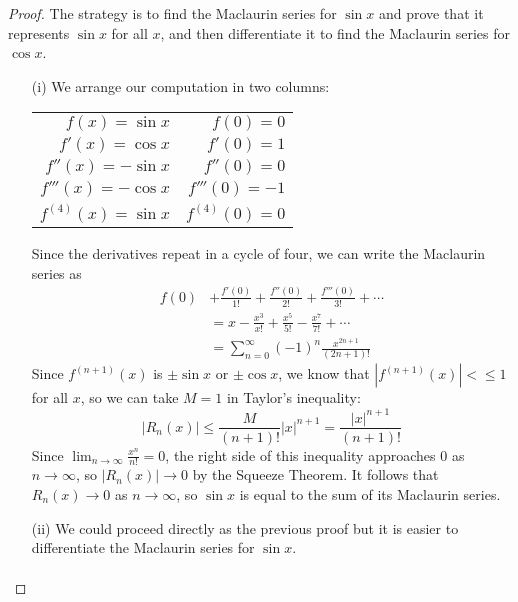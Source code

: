   \begin{proof}\let\qed\relax
    The strategy is to find the Maclaurin series for $\sin x$ and prove that it represents $\sin x$ for all $x$, and then differentiate it to find the Maclaurin series for $\cos x$.
    \begin{enumerate}
      \item[(i)] We arrange our computation in two columns: \\
      \begin{minipage}{\textwidth}
        \begin{center}
          \bgroup
          \def\arraystretch{1.5}
          \begin{tabular}{ r r }
            $f(x) = \sin x$  & $f(0)= 0$ \\
            $f'(x) = \cos x$  & $f'(0)= 1$ \\
            $f''(x) = -\sin x$  & $f''(0)= 0$ \\
            $f'''(x) = -\cos x$  & $f'''(0)= -1$ \\
            $f^{(4)}(x) = \sin x$  & $f^{(4)}(0)= 0$ \\
          \end{tabular}
          \egroup
        \end{center}
      \end{minipage}
      Since the derivatives repeat in a cycle of four, we can write the Maclaurin series as
      \begin{align*}
        f(0) &+ \frac{f'(0)}{1!} + \frac{f''(0)}{2!} + \frac{f'''(0)}{3!} + \cdots \\
        &= x - \frac{x^3}{x!} + \frac{x^5}{5!} - \frac{x^7}{7!} + \cdots \\
        &= \sum_{n=0}^{\infty} (-1)^n \frac{x^{2n+1}}{(2n+1)!}
      \end{align*}
      Since $f^{(n+1)}(x)$ is $\pm \sin x$ or $\pm \cos x$, we know that $|f^{(n+1)}(x)| <\leq 1$ for all $x$, so we can take $M=1$ in Taylor's inequality:
      $$ |R_n (x)| \leq \frac{M}{(n+1)!}|x|^{n+1} = \frac{|x|^{n+1}}{(n+1)!} $$
      Since $\displaystyle\lim_{n\to\infty} \frac{x^n}{n!} = 0$, the right side of this inequality approaches 0 as $n\to\infty$, so $|R_n (x)| \to 0$ by the Squeeze Theorem. It follows that $R_n (x) \to 0$ as $n\to\infty$, so $\sin x$ is equal to the sum of its Maclaurin series.
      \item[(ii)] We could proceed directly as the previous proof but it is easier to differentiate the Maclaurin series for $\sin x$.
      \begin{align*}

\end{align*}
\end{enumerate}
\end{proof}

